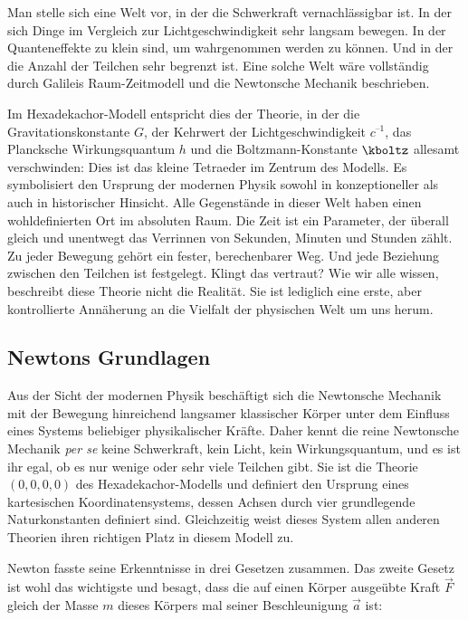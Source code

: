 
\newpage {}
\label{sec:0000}

Man stelle sich eine Welt vor, in der die Schwerkraft vernachlässigbar ist. In der sich Dinge im Vergleich zur Lichtgeschwindigkeit sehr langsam bewegen. In der Quanteneffekte zu klein sind, um wahrgenommen werden zu können. Und in der die Anzahl der Teilchen sehr begrenzt ist. Eine solche Welt wäre vollständig durch Galileis Raum-Zeitmodell und die Newtonsche Mechanik beschrieben.

Im Hexadekachor-Modell entspricht dies der Theorie, in der die Gravitationskonstante $G$, der Kehrwert der Lichtgeschwindigkeit $c^{–1}$, das Plancksche Wirkungsquantum $h$ und die Boltzmann-Konstante $\kboltz$ allesamt verschwinden: Dies ist das kleine Tetraeder im Zentrum des Modells. Es symbolisiert den Ursprung der modernen Physik sowohl in konzeptioneller als auch in historischer Hinsicht. Alle Gegenstände in dieser Welt haben einen wohldefinierten Ort im absoluten Raum. Die Zeit ist ein Parameter, der überall gleich und unentwegt das Verrinnen von Sekunden, Minuten und Stunden zählt. Zu jeder Bewegung gehört ein fester, berechenbarer Weg. Und jede Beziehung zwischen den Teilchen ist festgelegt. Klingt das vertraut? Wie wir alle wissen, beschreibt diese Theorie nicht die Realität. Sie ist lediglich eine erste, aber kontrollierte Annäherung an die Vielfalt der physischen Welt um uns herum.


\subsection*{Newtons Grundlagen}

Aus der Sicht der modernen Physik beschäftigt sich die Newtonsche Mechanik mit der Bewegung hinreichend langsamer klassischer Körper unter dem Einfluss eines Systems beliebiger physikalischer Kräfte. Daher kennt die reine Newtonsche Mechanik \textit{per se} keine Schwerkraft, kein Licht, kein Wirkungsquantum, und es ist ihr egal, ob es nur wenige oder sehr viele Teilchen gibt. Sie ist die Theorie $(0,0,0,0)$ des Hexadekachor-Modells und definiert den Ursprung eines kartesischen Koordinatensystems, dessen Achsen durch vier grundlegende Naturkonstanten definiert sind. Gleichzeitig weist dieses System allen anderen Theorien ihren richtigen Platz in diesem Modell zu.

Newton fasste seine Erkenntnisse in drei Gesetzen zusammen. Das zweite Gesetz ist wohl das wichtigste und besagt, dass die auf einen Körper ausgeübte Kraft $\vec{F}$ gleich der Masse $m$ dieses Körpers mal seiner Beschleunigung $\vec{a}$ ist:


